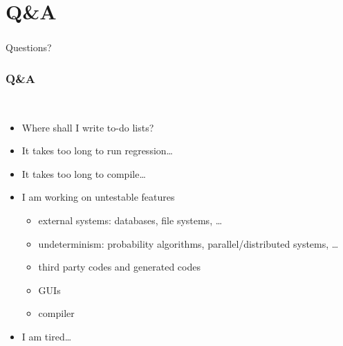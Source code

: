 \documentclass[lualatex]{beamer}
\begin{document}
\section{Q\&A}

\begin{frame}
  \frametitle{}
  \begin{center}
    \Huge
    Questions?
  \end{center}
\end{frame}

\begin{frame}
    \frametitle{Q\&A}

    \begin{block}{~}
        \begin{itemize}
        \item<1->
            Where shall I write to-do lists?
        \item<2->
            It takes too long to run regression\ldots
        \item<3->
            It takes too long to compile\ldots
        \item<4->
            I am working on untestable features
            \begin{itemize}
                \item
                    external systems: databases, file systems, \ldots
                \item
                    undeterminism: probability algorithms, parallel/distributed systems, \ldots
                \item 
                    third party codes and generated codes
                \item 
                    GUIs
                \item 
                    compiler
            \end{itemize}
        \item<5>
            I am tired\ldots
        \end{itemize}
    \end{block}
\end{frame}
\end{document}
